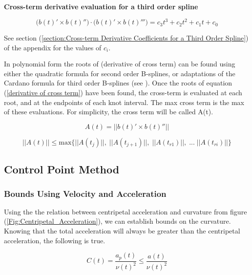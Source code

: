 \documentclass{article}
\begin{document}
    \textbf{Cross-term derivative evaluation for a third order spline}
    
\hspace{1cm}

\begin{equation}
    \big(b(t)' \times b(t)''\big) \cdot \big(b(t)' \times b(t)'''\big) = c_3 t^3 + c_2 t^2 + c_1 t + c_0
\end{equation}

See section (\ref{section:Cross-term Derivative Coefficients for a Third Order Spline}) of the appendix for the values of \(c_i\).

\hspace{1cm}

In polynomial form the roots of ({derivative of cross term}) can be found using either the quadratic formula for second order B-splines, or adaptations of the Cardano formula for third order B-splines (see \cite{WEBPAGE:Weisstein}). Once the roots of equation (\ref{derivative of cross term}) have been found, the cross-term is evaluated at each root, and at the endpoints of each knot interval. The max cross term is the max of these evaluations. For simplicity, the cross term will be called A(t).

\begin{equation}
    A(t) = ||b(t)' \times b(t)''||
\end{equation}

\begin{equation}
    ||A(t)|| \leq \text{max}\{ ||A(t_j)|| ,\; ||A(t_{j+1})|| ,\; ||A(t_{r1})|| ,\; ... \;  ||A(t_{ri})|| \}
\end{equation}

\subsection{Control Point Method}

\subsubsection{Bounds Using Velocity and Acceleration}

Using the the relation between centripetal acceleration and curvature from figure (\ref{Fig:Centripetal_Acceleration}), we can establish bounds on the curvature. Knowing that the total acceleration will always be greater than the centripetal acceleration, the following is true.

\begin{equation} \label{eq:acceleration and velocity bounds}
    C(t) = \frac{a_p(t)}{\nu(t)^2} \leq \frac{a(t)}{\nu(t)^2} 
\end{equation}
\end{document}
